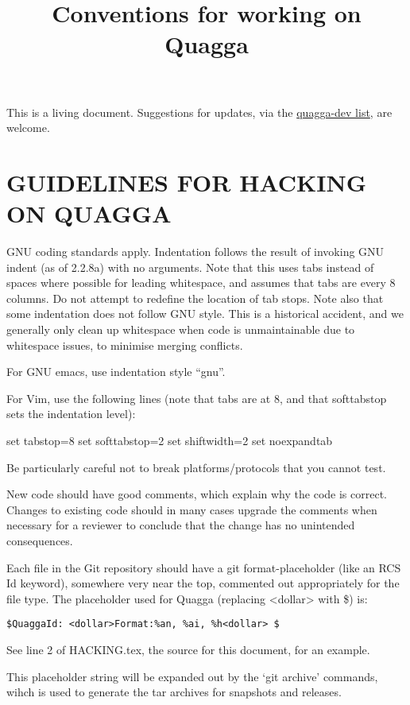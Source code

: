 \documentclass[oneside]{article}
\title{Conventions for working on Quagga}
\begin{document}
\maketitle

This is a living document. Suggestions for updates, via the
\href{http://lists.quagga.net/mailman/listinfo/quagga-dev}{quagga-dev list},
are welcome.

\tableofcontents

\section{GUIDELINES FOR HACKING ON QUAGGA}
\label{sec:guidelines}


GNU coding standards apply.  Indentation follows the result of
invoking GNU indent (as of 2.2.8a) with no arguments.  Note that this
uses tabs instead of spaces where possible for leading whitespace, and
assumes that tabs are every 8 columns.  Do not attempt to redefine the
location of tab stops.  Note also that some indentation does not
follow GNU style.  This is a historical accident, and we generally
only clean up whitespace when code is unmaintainable due to whitespace
issues, to minimise merging conflicts.

For GNU emacs, use indentation style ``gnu''.

For Vim, use the following lines (note that tabs are at 8, and that
softtabstop sets the indentation level):

set tabstop=8
set softtabstop=2
set shiftwidth=2
set noexpandtab

Be particularly careful not to break platforms/protocols that you
cannot test.

New code should have good comments, which explain why the code is correct.
Changes to existing code should in many cases upgrade the comments when
necessary for a reviewer to conclude that the change has no unintended
consequences.

Each file in the Git repository should have a git format-placeholder (like
an RCS Id keyword), somewhere very near the top, commented out appropriately
for the file type. The placeholder used for Quagga (replacing <dollar> with
\$) is:

	\verb|$QuaggaId: <dollar>Format:%an, %ai, %h<dollar> $|

See line 2 of HACKING.tex, the source for this document, for an example.

This placeholder string will be expanded out by the `git archive' commands,
wihch is used to generate the tar archives for snapshots and releases.
\end{document}
